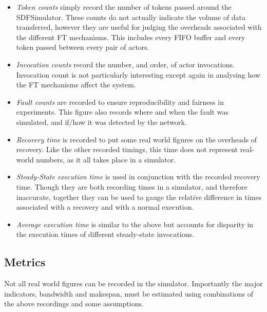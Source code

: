 \begin{itemize}
	\item {\em Token counts} simply record the number of tokens passed around the SDFSimulator.
			These counts do not actually indicate the volume of data transferred, however they are useful for judging the overheads associated with the different FT mechanisms.
			This includes every FIFO buffer and every token passed between every pair of actors.
	\item {\em Invocation counts} record the number, and order, of actor invocations.
			Invocation count is not particularly interesting except again in analysing how the FT mechanisms affect the system.
	\item {\em Fault counts} are recorded to ensure reproducibility and fairness in experiments.
			This figure also records where and when the fault was simulated, and if/how it was detected by the network.
	\item {\em Recovery time} is recorded to put some real world figures on the overheads of recovery.
			Like the other recorded timings, this time does not represent real-world numbers, as it all takes place in a simulator.
	\item {\em Steady-State execution time} is used in conjunction with the recorded recovery time.
			Though they are both recording times in a simulator, and therefore inaccurate, together they can be used to gauge the relative difference in times associated with a recovery and with a normal execution.
	\item {\em Average execution time} is similar to the above but accounts for disparity in the execution times of different steady-state invocations.
\end{itemize}

\subsection{Metrics}
\label{secSystemMetrics}

Not all real world figures can be recorded in the simulator.
Importantly the major indicators, bandwidth and makespan, must be estimated using combinations of the above recordings and some assumptions.

